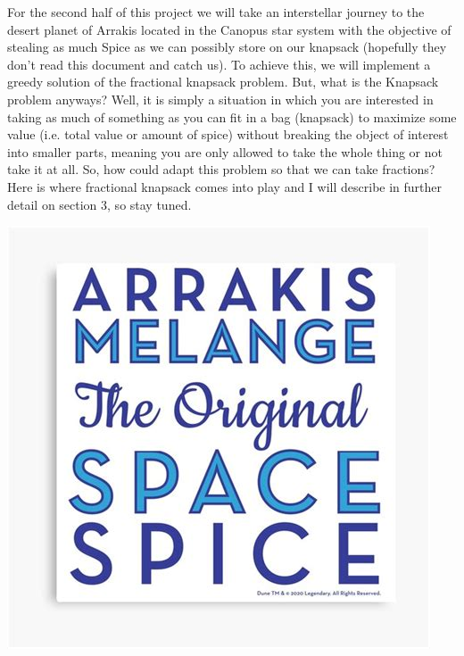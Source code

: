 \documentclass[letterpaper, 10pt]{article}
\begin{document}
For the second half of this project we will take an interstellar journey to the desert planet of Arrakis located in the Canopus star system with the objective of stealing as much Spice as we can possibly store on our knapsack (hopefully they don't read this document and catch us). To achieve this, we will implement a greedy solution of the fractional knapsack problem. But, what is the Knapsack problem anyways? Well, it is simply a situation in which you are interested in taking as much of something as you can fit in a bag (knapsack) to maximize some value (i.e. total value or amount of spice) without breaking the object of interest into smaller parts, meaning you are only allowed to take the whole thing or not take it at all. So, how could adapt this problem so that we can take fractions? Here is where fractional knapsack comes into play and I will describe in further detail on section 3, so stay tuned.
\\
\begin{center}
    \includegraphics[scale=0.5]{images/fracKnap.jpg}
\end{center}
\\
\end{document}
